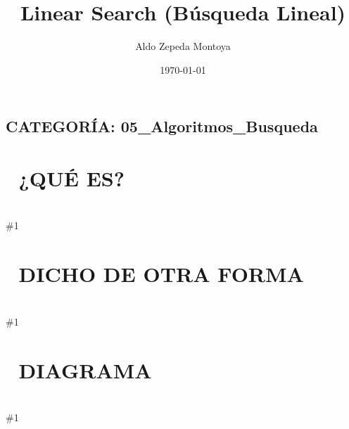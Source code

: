 \documentclass{article}
\newcommand{\quees}[1]{
    \section*{🤔 ¿QUÉ ES?}
    \hrulefill \\
    \#1
}
\newcommand{\dichodeotraforma}[1]{
    \section*{💬 DICHO DE OTRA FORMA}
    \hrulefill \\
    \#1
}
\newcommand{\diagrama}[1]{
    \section*{🎨 DIAGRAMA}
    \hrulefill \\
    \#1
}
\begin{document}
\title{Linear Search (Búsqueda Lineal)}
\author{Aldo Zepeda Montoya}
\date{\today}
\maketitle

\subsection*{CATEGORÍA: 05\_Algoritmos\_Busqueda}

\quees{
Buscar tus llaves en casa 🔑 revisando cuarto por cuarto, cajón por
cajón, sin ningún orden especial. 

Empiezas en un lugar y revisas todo hasta que las encuentras o hasta
que verificas que no están en ningún lado. Es la forma más básica y 
natural de buscar algo.
}

\dichodeotraforma{
Linear Search es un algoritmo de búsqueda que recorre un conjunto de
datos secuencialmente (uno por uno) de principio a fin. 

No requiere que los datos estén ordenados. Su simplicidad lo hace
ideal para datasets pequeños o cuando solo vas a buscar algo una vez
y no vale la pena ordenar todo el conjunto primero.
}

\diagrama{\begin{verbatim}
Buscar el número 7 en el array:
[ 3, 1, 9, 7, 5 ]

Paso 1: ¿3 == 7? No.
Paso 2: ¿1 == 7? No.
Paso 3: ¿9 == 7? No.
Paso 4: ¿7 == 7? ¡SÍ! 🎉

Encontrado en 4 pasos.
\end{verbatim}}
\end{document}
